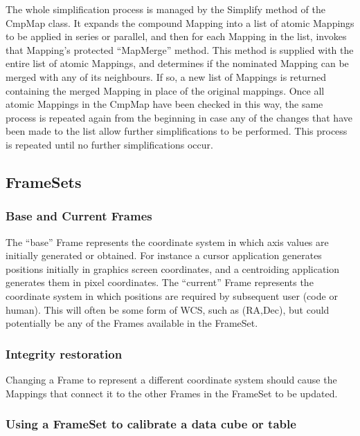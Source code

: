 \documentclass[final,authoryear,5p,times,twocolumn]{elsarticle}
\begin{document}
The whole simplification process is managed by the Simplify method of
the CmpMap class. It expands the compound Mapping into a list of
atomic Mappings to be applied in series or parallel, and then for each
Mapping in the list, invokes that Mapping’s protected ``MapMerge''
method. This method is supplied with the entire list of atomic
Mappings, and determines if the nominated Mapping can be merged with
any of its neighbours. If so, a new list of Mappings is returned
containing the merged Mapping in place of the original mappings. Once
all atomic Mappings in the CmpMap have been checked in this way, the
same process is repeated again from the beginning in case any of the
changes that have been made to the list allow further simplifications
to be performed. This process is repeated until no further
simplifications occur.

\subsection{FrameSets}

\subsubsection{Base and Current Frames}

The ``base'' Frame represents the coordinate system in which axis values
are initially generated or obtained. For instance a cursor application
generates positions initially in graphics screen coordinates, and a
centroiding application generates them in pixel coordinates.  The
``current'' Frame represents the coordinate system in which positions
are required by subsequent user (code or human). This will often be
some form of WCS, such as (RA,Dec), but could potentially be any of
the Frames available in the FrameSet.

\subsubsection{Integrity restoration}

Changing a Frame to represent a different coordinate system should
cause the Mappings that connect it to the other Frames in the FrameSet
to be updated.

\subsubsection{Using a FrameSet to calibrate a data cube or table}
\end{document}
